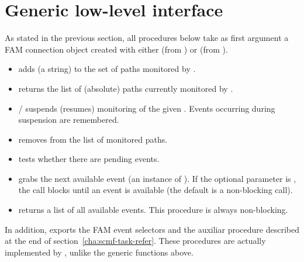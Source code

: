 \section{Generic low-level interface}
\label{sec:generic-low-level}

As stated in the previous section, all procedures below take as first
argument a FAM connection object created with either 
(from ) or  (from ).

\begin{itemize}
\item {} adds  (a string) to
  the set of paths monitored by .
\item {} returns the list of (absolute)
  paths currently monitored by .
\item {}/ suspends (resumes)
  monitoring of the given . Events occurring during
  suspension are remembered.
\item {} removes 
  from the list of monitored paths.
\item {} tests whether there are pending events.
\item {} grabs the next available event
  (an instance of ). If the optional parameter
   is , the call blocks until an event is available
  (the default is a non-blocking call).
\item {} returns a list of all available
  events. This procedure is always non-blocking.
\end{itemize}

In addition,  exports the FAM event selectors and the
auxiliar procedure  described at the end
of section~\ref{cha:scmf-task-refer}. These procedures are actually
implemented by , unlike the generic functions above.


